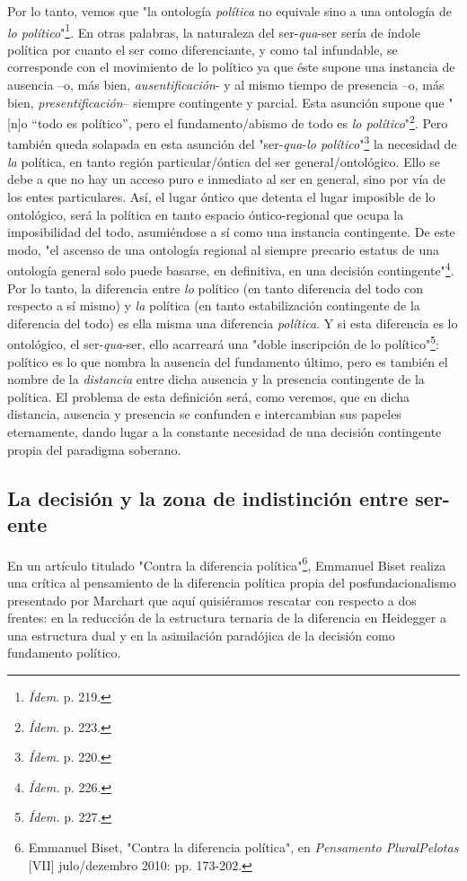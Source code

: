 Por lo tanto, vemos que "la ontología \emph{política} no equivale sino a
una ontología de \emph{lo político}"\footnote{\emph{Ídem}. p. 219.}. En
otras palabras, la naturaleza del ser-\emph{qua}-ser sería de índole
política por cuanto el ser como diferenciante, y como tal infundable, se
corresponde con el movimiento de lo político ya que éste supone una
instancia de ausencia --o, más bien, \emph{ausentificación}- y al mismo
tiempo de presencia --o, más bien, \emph{presentificación}-- siempre
contingente y parcial. Esta asunción supone que "{[}n{]}o ``todo es
político'', pero el fundamento/abismo de todo es \emph{lo
político}"\footnote{\emph{Ídem}. p. 223.}. Pero también queda solapada
en esta asunción del "ser-\emph{qua}-\emph{lo político}"\footnote{\emph{Ídem}.
  p. 220.} la necesidad de \emph{la} política, en tanto región
particular/óntica del ser general/ontológico. Ello se debe a que no hay
un acceso puro e inmediato al ser en general, sino por vía de los entes
particulares. Así, el lugar óntico que detenta el lugar imposible de lo
ontológico, será la política en tanto espacio óntico-regional que ocupa
la imposibilidad del todo, asumiéndose a sí como una instancia
contingente. De este modo, "el ascenso de una ontología regional al
siempre precario estatus de una ontología general solo puede basarse, en
definitiva, en una decisión contingente"\footnote{\emph{Ídem.} p. 226.}.
Por lo tanto, la diferencia entre \emph{lo} político (en tanto
diferencia del todo con respecto a sí mismo) y \emph{la} política (en
tanto estabilización contingente de la diferencia del todo) es ella
misma una diferencia \emph{política}. Y si esta diferencia es lo
ontológico, el ser-\emph{qua}-ser, ello acarreará una "doble inscripción
de lo político"\footnote{\emph{Ídem.} p. 227.}: político es lo que
nombra la ausencia del fundamento último, pero es también el nombre de
la \emph{distancia} entre dicha ausencia y la presencia contingente de
la política. El problema de esta definición será, como veremos, que en
dicha distancia, ausencia y presencia se confunden e intercambian sus
papeles eternamente, dando lugar a la constante necesidad de una
decisión contingente propia del paradigma soberano.

\subsection{La decisión y la zona de indistinción entre ser-ente}

En un artículo titulado "Contra la diferencia política"\footnote{Emmanuel
  Biset, "Contra la diferencia política", en \emph{Pensamento
  Plural\textbar Pelotas} {[}VII{]} julo/dezembro 2010: pp. 173-202.},
Emmanuel Biset realiza una crítica al pensamiento de la diferencia
política propia del posfundacionalismo presentado por Marchart que aquí
quisiéramos rescatar con respecto a dos frentes: en la reducción de la
estructura ternaria de la diferencia en Heidegger a una estructura dual
y en la asimilación paradójica de la decisión como fundamento político.

